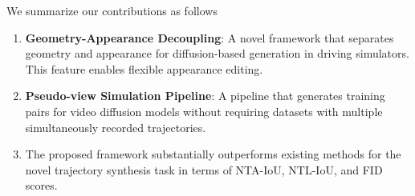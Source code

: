 


We summarize our contributions as follows
\begin{enumerate}
    \item \textbf{Geometry-Appearance Decoupling}: A novel framework that separates geometry and appearance for diffusion-based generation in driving simulators. This feature enables flexible appearance editing.
    \item \textbf{Pseudo-view Simulation Pipeline}: A pipeline that generates training pairs for video diffusion models without requiring datasets with multiple simultaneously recorded trajectories.
    \item The proposed framework substantially outperforms existing methods for the novel trajectory synthesis task in terms of NTA-IoU, NTL-IoU, and FID scores.

\end{enumerate}